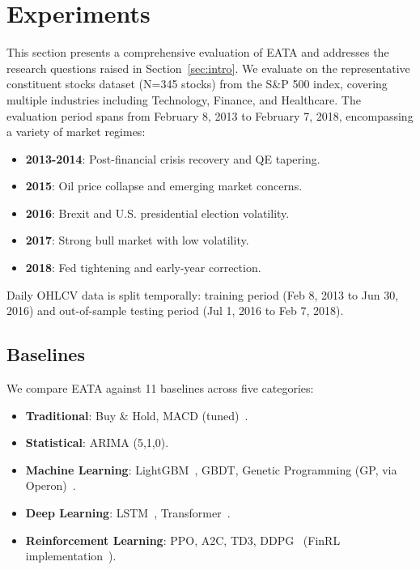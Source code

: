 \section{Experiments}
\label{sec:experiments}

This section presents a comprehensive evaluation of EATA and addresses the research questions raised in Section~\ref{sec:intro}. We evaluate on the representative constituent stocks dataset (N=345 stocks) from the S\&P 500 index, covering multiple industries including Technology, Finance, and Healthcare. The evaluation period spans from February 8, 2013 to February 7, 2018, encompassing a variety of market regimes:
\begin{itemize}
    \item \textbf{2013-2014}: Post-financial crisis recovery and QE tapering.
    \item \textbf{2015}: Oil price collapse and emerging market concerns.
    \item \textbf{2016}: Brexit and U.S. presidential election volatility.
    \item \textbf{2017}: Strong bull market with low volatility.
    \item \textbf{2018}: Fed tightening and early-year correction.
\end{itemize}
Daily OHLCV data is split temporally: training period (Feb 8, 2013 to Jun 30, 2016) and out-of-sample testing period (Jul 1, 2016 to Feb 7, 2018).


\subsection{Baselines}
We compare EATA against 11 baselines across five categories:
\begin{itemize}
    \item \textbf{Traditional}: Buy \& Hold, MACD (tuned)~\cite{appel2005technical}.
    \item \textbf{Statistical}: ARIMA (5,1,0).
    \item \textbf{Machine Learning}: LightGBM~\cite{ke2017lightgbm}, GBDT, Genetic Programming (GP, via Operon)~\cite{burlacu2020operon}.
    \item \textbf{Deep Learning}: LSTM~\cite{fischer2018deep,hochreiter1997long}, Transformer~\cite{ding2020hierarchical,vaswani2017attention}.
    \item \textbf{Reinforcement Learning}: PPO, A2C, TD3, DDPG~\cite{schulman2017proximal} (FinRL implementation~\cite{liu2020finrl}).
\end{itemize}

